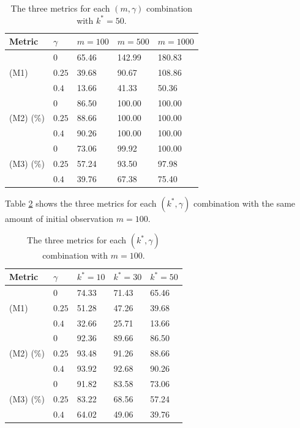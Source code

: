 \documentclass{article}
\theoremstyle{definition}
\begin{document}
\begin{table}[!htb]
\centering
\begin{tabular}{l|l|lll}
\hline
Metric                & $\gamma$ & $m=100$  & $m=500 $          & $m=1000$ \\ \hline
\multirow{3}{*}{(M1)} & $0$      & 65.46 & 142.99 & 180.83 \\
                      & $0.25$   & 39.68  & 90.67          & 108.86 \\
                      & $0.4$    & 13.66  & 41.33           & 50.36 \\ \hline
\multirow{3}{*}{(M2) (\%)} & $0$      & 86.50  & 100.00          & 100.00 \\
                      & $0.25$   & 88.66  & 100.00          & 100.00 \\
                      & $0.4$    & 90.26  & 100.00          & 100.00 \\ \hline
\multirow{3}{*}{(M3) (\%)} & $0$      & 73.06  & 99.92           & 100.00 \\
                      & $0.25$   & 57.24  & 93.50           & 97.98  \\
                      & $0.4$    & 39.76  & 67.38           & 75.40  \\ \hline
\end{tabular}
\caption{The three metrics for each $(m,\gamma)$ combination with $k^* = 50$.}
\label{table: asymptotic results under the alternative1}
\end{table}
Table \ref{table: asymptotic results under the alternative2} shows the three metrics for each $(k^*,\gamma)$ combination with the same amount of initial observation $m = 100$. 
\begin{table}[!htb]
\centering
\begin{tabular}{l|l|lll}
\hline
Metric                & $\gamma$ & $k^*=10$  & $k^*=30$           & $k^* = 50$ \\ \hline
\multirow{3}{*}{(M1)} & $0$      & 74.33 & 71.43 & 65.46 \\
                      & $0.25$   & 51.28 & 47.26          & 39.68 \\
                      & $0.4$    & 32.66  & 25.71          & 13.66 \\ \hline
\multirow{3}{*}{(M2) (\%)} & $0$      & 92.36 & 89.66         & 86.50 \\
                      & $0.25$   & 93.48  & 91.26         & 88.66 \\
                      & $0.4$    & 93.92  & 92.68         & 90.26 \\ \hline
\multirow{3}{*}{(M3) (\%)} & $0$      & 91.82  & 83.58         & 73.06 \\
                      & $0.25$   & 83.22  & 68.56           & 57.24  \\
                      & $0.4$    & 64.02  & 49.06           & 39.76 \\ \hline
\end{tabular}
\caption{The three metrics for each $(k^*,\gamma)$ combination with $m = 100$.}
\label{table: asymptotic results under the alternative2}
\end{table}
\end{document}

